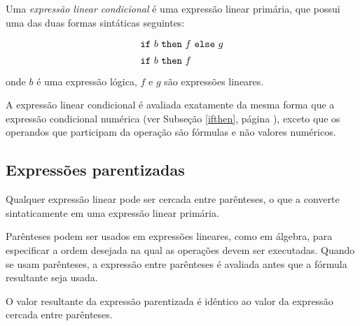 \documentclass[11pt, brazil]{report}
\begin{document}
Uma {\it expressão linear condicional} é uma expressão linear primária,
que possui uma das duas formas sintáticas seguintes:
$$
{\def\arraystretch{1.4}
\begin{array}{l}
\mbox{{\tt if} $b$ {\tt then} $f$ {\tt else} $g$}\\
\mbox{{\tt if} $b$ {\tt then} $f$}\\
\end{array}
}
$$
onde $b$ é uma expressão lógica, $f$ e $g$ são expressões lineares.




A expressão linear condicional é avaliada exatamente da mesma forma
que a expressão \linebreak condicional numérica (ver Subseção \ref{ifthen},
página \pageref{ifthen}), exceto que os operandos que participam da operação
são fórmulas e não valores numéricos.


\subsection{Expressões parentizadas}

Qualquer expressão linear pode ser cercada entre parênteses, o que a
converte sintaticamente em uma expressão linear primária.

Parênteses podem ser usados em expressões lineares, como em álgebra, para
especificar a ordem desejada na qual as operações devem ser executadas.
Quando se usam parênteses, a expressão entre parênteses é avaliada antes
que a fórmula resultante seja usada.

O valor resultante da expressão parentizada é idêntico ao valor da
expressão cercada entre parênteses.
\end{document}

